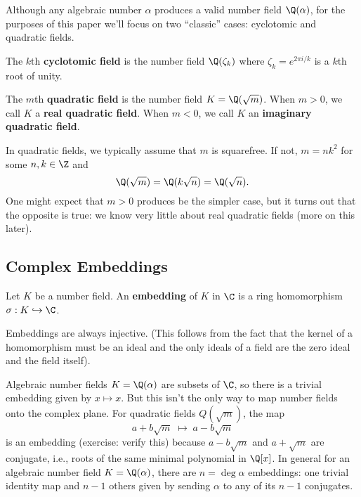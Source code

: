 Although any algebraic number $\alpha$ produces a valid number field $\Q(\alpha)$, for the purposes of this paper we'll focus on two ``classic'' cases: cyclotomic and quadratic fields.

\begin{definition}
    The $k$th \textbf{cyclotomic field} is the number field $\Q(\zeta_k)$ where $\zeta_k = e^{2 \pi i / k}$ is a $k$th root of unity.
\end{definition}

\begin{definition}
    The $m$th \textbf{quadratic field} is the number field $K = \Q(\sqrt{m})$. When $m > 0$, we call $K$ a \textbf{real quadratic field}. When $m < 0$, we call $K$ an \textbf{imaginary quadratic field}.
\end{definition}

In quadratic fields, we typically assume that $m$ is squarefree. If not, $m = nk^2$ for some $n, k \in \Z$ and
\begin{equation}
    \Q(\sqrt m) = \Q(k \sqrt n) = \Q(\sqrt{n}).
\end{equation}
One might expect that $m > 0$ produces be the simpler case, but it turns out that the opposite is true: we know very little about real quadratic fields (more on this later).

\subsection{Complex Embeddings}

\begin{definition}[Embedding]
    Let $K$ be a number field. An \textbf{embedding} of $K$ in $\C$ is a ring homomorphism $\sigma : K \hookrightarrow \C$.

    Embeddings are always injective. (This follows from the fact that the kernel of a homomorphism must be an ideal and the only ideals of a field are the zero ideal and the field itself).
\end{definition}

Algebraic number fields $K = \Q(\alpha)$ are subsets of $\C$, so there is a trivial embedding given by $x \mapsto x$. But this isn't the only way to map number fields onto the complex plane. For quadratic fields $Q(\sqrt{m})$, the map
\begin{equation}
    a + b \sqrt{m} \; \mapsto \; a - b \sqrt{m}
\end{equation}
is an embedding (exercise: verify this) because $a - b \sqrt{m}$ and $a + \sqrt{m}$ are conjugate, i.e., roots of the same minimal polynomial in $\Q[x]$. In general for an algebraic number field $K = \Q(\alpha)$, there are $n = \deg \alpha$ embeddings: one trivial identity map and $n-1$ others given by sending $\alpha$ to any of its $n - 1$ conjugates.

